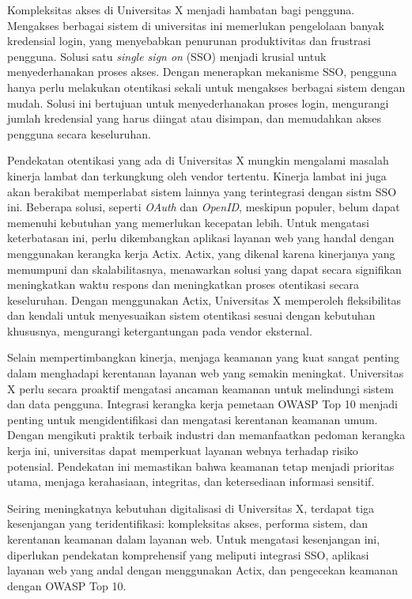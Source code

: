 \documentclass[12pt]{article}
\begin{document}
Kompleksitas akses di Universitas X menjadi hambatan bagi pengguna. Mengakses berbagai sistem di universitas ini memerlukan pengelolaan banyak kredensial login, yang menyebabkan penurunan produktivitas dan frustrasi pengguna. Solusi satu \emph{single sign on} (SSO) menjadi krusial untuk menyederhanakan proses akses. Dengan menerapkan mekanisme SSO, pengguna hanya perlu melakukan otentikasi sekali untuk mengakses berbagai sistem dengan mudah. Solusi ini bertujuan untuk menyederhanakan proses login, mengurangi jumlah kredensial yang harus diingat atau disimpan, dan memudahkan akses pengguna secara keseluruhan.

Pendekatan otentikasi yang ada di Universitas X mungkin mengalami masalah kinerja lambat dan terkungkung oleh vendor tertentu. Kinerja lambat ini juga akan berakibat memperlabat sistem lainnya yang terintegrasi dengan  sistm SSO ini. Beberapa solusi, seperti \emph{OAuth} dan \emph{OpenID}, meskipun populer, belum dapat memenuhi kebutuhan yang memerlukan kecepatan lebih. Untuk mengatasi keterbatasan ini, perlu dikembangkan aplikasi layanan web yang handal dengan menggunakan kerangka kerja Actix. Actix, yang dikenal karena kinerjanya yang memumpuni dan skalabilitasnya, menawarkan solusi yang dapat secara signifikan meningkatkan waktu respons dan meningkatkan proses otentikasi secara keseluruhan. Dengan menggunakan Actix, Universitas X memperoleh fleksibilitas dan kendali untuk menyesuaikan sistem otentikasi sesuai dengan kebutuhan khususnya, mengurangi ketergantungan pada vendor eksternal.

Selain mempertimbangkan kinerja, menjaga keamanan yang kuat sangat penting dalam menghadapi kerentanan layanan web yang semakin meningkat. Universitas X perlu secara proaktif mengatasi ancaman keamanan untuk melindungi sistem dan data pengguna. Integrasi kerangka kerja pemetaan OWASP Top 10 menjadi penting untuk mengidentifikasi dan mengatasi kerentanan keamanan umum. Dengan mengikuti praktik terbaik industri dan memanfaatkan pedoman kerangka kerja ini, universitas dapat memperkuat layanan webnya terhadap risiko potensial. Pendekatan ini memastikan bahwa keamanan tetap menjadi prioritas utama, menjaga kerahasiaan, integritas, dan ketersediaan informasi sensitif.

Seiring meningkatnya kebutuhan digitalisasi di Universitas X, terdapat tiga kesenjangan yang teridentifikasi: kompleksitas akses, performa sistem, dan kerentanan keamanan dalam layanan web. Untuk mengatasi kesenjangan ini, diperlukan pendekatan komprehensif yang meliputi integrasi SSO, aplikasi layanan web yang andal dengan menggunakan Actix, dan pengecekan keamanan dengan OWASP Top 10.
\end{document}
